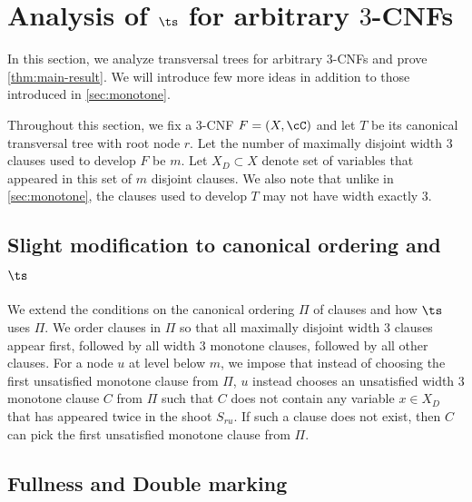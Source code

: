 \section{Analysis of $\ts$ for arbitrary $3$-CNFs} \label{sec:non-monotone}



In this section, we analyze transversal trees for arbitrary $3$-CNFs and prove \cref{thm:main-result}. We will introduce few more ideas in addition to those introduced in \cref{sec:monotone}.

Throughout this section, we fix a $3$-CNF $F = (X, \cC)$ and let $T$ be its canonical transversal tree with root node $r$. Let the number of maximally disjoint width $3$ clauses used to develop $F$ be $m$. Let $X_D\subset X$ denote set of variables that appeared in this set of $m$ disjoint clauses. 
We also note that unlike in \cref{sec:monotone}, the clauses used to develop $T$ may not have width exactly $3$.




\subsection{Slight modification to canonical ordering and $\ts$}

We extend the conditions on the canonical ordering $\Pi$ of clauses and how $\ts$ uses $\Pi$. We order clauses in $\Pi$ so that all maximally disjoint width $3$ clauses appear first, followed by all width $3$ monotone clauses, followed by all other clauses.
For a node $u$ at level below $m$, we impose that instead of choosing the first unsatisfied monotone clause from $\Pi$, $u$ instead chooses an unsatisfied width $3$ monotone clause $C$ from $\Pi$ such that $C$ does not contain any variable $x\in X_D$ that has appeared twice in the shoot $S_{ru}$. If such a clause does not exist, then $C$ can pick the first unsatisfied monotone clause from $\Pi$.




\subsection{Fullness and Double marking}

